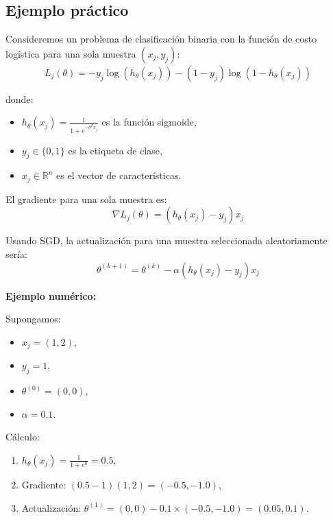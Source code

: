 \documentclass[12pt, letterpaper,conference]{IEEEtran}
\begin{document}
\vspace{0.25cm}

\subsection{Ejemplo práctico}

Consideremos un problema de clasificación binaria con la función de costo logística para una sola muestra \((x_j, y_j)\):
\[
L_j(\theta) = - y_j \log(h_\theta(x_j)) - (1 - y_j) \log(1 - h_\theta(x_j))
\]

donde:
\begin{itemize}
    \item \( h_\theta(x_j) = \frac{1}{1 + e^{-\theta^T x_j}} \) es la función sigmoide,
    \item \( y_j \in \{0, 1\} \) es la etiqueta de clase,
    \item \( x_j \in \mathbb{R}^n \) es el vector de características.
\end{itemize}

El gradiente para una sola muestra es:
\[
\nabla L_j(\theta) = (h_\theta(x_j) - y_j) x_j
\]

Usando SGD, la actualización para una muestra seleccionada aleatoriamente sería:
\[
\theta^{(k+1)} = \theta^{(k)} - \alpha (h_\theta(x_j) - y_j) x_j
\]

\textbf{Ejemplo numérico:}
\vspace{0.15cm}

Supongamos:

\begin{itemize}
    \item \( x_j = (1, 2) \),
    \item \( y_j = 1 \),
    \item \( \theta^{(0)} = (0, 0) \),
    \item \( \alpha = 0.1 \).
\end{itemize}

\vspace{0.15cm}

Cálculo:
\begin{enumerate}
    \item \( h_\theta(x_j) = \frac{1}{1 + e^{0}} = 0.5 \),
    \item Gradiente: \( (0.5 - 1) (1, 2) = (-0.5, -1.0) \),
    \item Actualización: \( \theta^{(1)} = (0, 0) - 0.1 \times (-0.5, -1.0) = (0.05, 0.1) \).
\end{enumerate}
\end{document}
